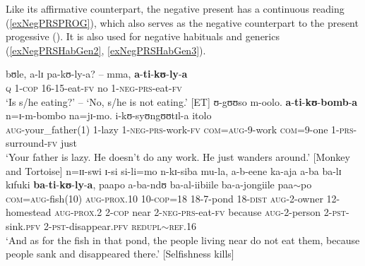Like its affirmative counterpart, the negative present has a continuous reading (\ref{exNegPRSPROG}), which also serves as the negative counterpart to the present progessive (). It is also used for negative habituals and generics (\ref{exNegPRSHabGen2}, \ref{exNegPRSHabGen3}).
\begin{exe}
\ex \label{exNegPRSPROG} \gll bʊle, a-lɪ pa-kʊ-ly-a? -- mma, \textbf{a}-\textbf{ti}-\textbf{kʊ}-\textbf{ly}-\textbf{a}\\
\textsc{q} 1-\textsc{cop} 16-15-eat-\textsc{fv} {} no 1-\textsc{neg}-\textsc{prs}-eat-\textsc{fv}\\
\glt \lq Is s/he eating?' -- \lq No, s/he is not eating.' [ET]
\ex \label{exNegPRSHabGen2} \gll ʊ-gʊʊso m-oolo. \textbf{a}-\textbf{ti}-\textbf{kʊ}-\textbf{bomb}-\textbf{a} n=ɪ-m-bombo na=jɪ-mo. i-kʊ-syʊngʊʊtɪl-a itolo\\
\textsc{aug}-your\_father(1) 1-lazy 1-\textsc{neg}-\textsc{prs}-work-\textsc{fv} \textsc{com}=\textsc{aug}-9-work \textsc{com}=9-one 1-\textsc{prs}-surround-\textsc{fv} just\\
\glt `Your father is lazy. He doesn't do any work. He just wanders around.' [Monkey and Tortoise] 
\ex \label{exNegPRSHabGen3} \gll n=ɪɪ-swi ɪ-si si-li=mo n-kɪ-siba mu-la, a-b-eene ka-aja a-ba ba-lɪ kɪfuki \textbf{ba}-\textbf{ti}-\textbf{kʊ}-\textbf{ly}-\textbf{a}, paapo a-ba-ndʊ ba-al-iibiile ba-a-jongiile paa$\sim$po\\
\textsc{com}=\textsc{aug}-fish(10) \textsc{aug}-\textsc{prox.10} 10-\textsc{cop}=18 18-7-pond 18-\textsc{dist} \textsc{aug}-2-owner 12-homestead \textsc{aug}-\textsc{prox.2} 2-\textsc{cop} near 2-\textsc{neg}-\textsc{prs}-eat-\textsc{fv} because \textsc{aug}-2-person 2-\textsc{pst}-sink.\textsc{pfv} 2-\textsc{pst}-disappear.\textsc{pfv} \textsc{redupl}$\sim$\textsc{ref.16}\\ 
\glt `And as for the fish in that pond, the people living near do not eat them, because people sank and disappeared there.' [Selfishness kills]
\end{exe}

